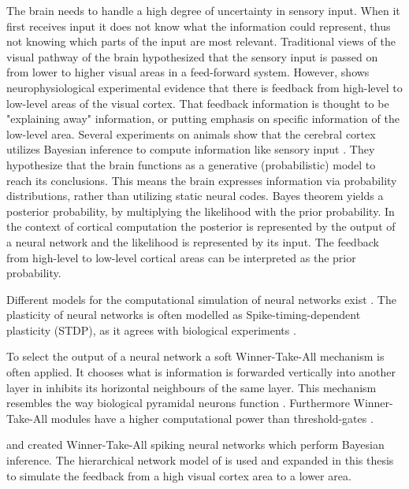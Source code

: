 The brain needs to handle a high degree of uncertainty in sensory input. When it first receives input it does not know what the information could represent, thus not knowing which parts of the input are most relevant. Traditional views of the visual pathway of the brain hypothesized that the sensory input is passed on from lower to higher visual areas in a feed-forward system. However, \citet{HierachicalBayesVisualCortex} shows  neurophysiological experimental evidence that there is feedback from high-level to low-level areas of the visual cortex. That feedback information is thought to be "explaining away" information, or putting emphasis on specific information of the low-level area. Several experiments on animals show that the cerebral cortex utilizes Bayesian inference to compute information like sensory input \citep{neuralSubstrate, HierachicalBayesVisualCortex, anatomyOfInference}. They hypothesize that the brain functions as a generative (probabilistic) model to reach its conclusions. This means the brain expresses information via probability distributions, rather than utilizing static neural codes. Bayes theorem yields a posterior probability, by multiplying the likelihood with the prior probability. In the context of cortical computation the posterior is represented by the output of a neural network and the likelihood is represented by its input. The feedback from high-level to low-level cortical areas can be interpreted as the prior probability.

Different models for the computational simulation of neural networks exist  \citep{SpikingNeuronModelsBook}. The plasticity of neural networks is often modelled as Spike-timing-dependent plasticity (STDP), as it agrees with biological experiments \citep{STDPFELDMAN, STDPDAN}. 

To select the output of a neural network a soft Winner-Take-All mechanism is often applied. It chooses what is information is forwarded vertically into another layer in inhibits its horizontal neighbours of the same layer.  This mechanism resembles the way biological pyramidal neurons function \citep{softWTA}. Furthermore Winner-Take-All modules have a higher computational power than threshold-gates \citep{WTAPower}.

\citet{nessler} and \citet{nesslerClone} created Winner-Take-All spiking neural networks which perform Bayesian inference. The hierarchical network model of \citet{nessler} is used and expanded in this thesis to simulate the feedback from a high visual cortex area to a lower area.